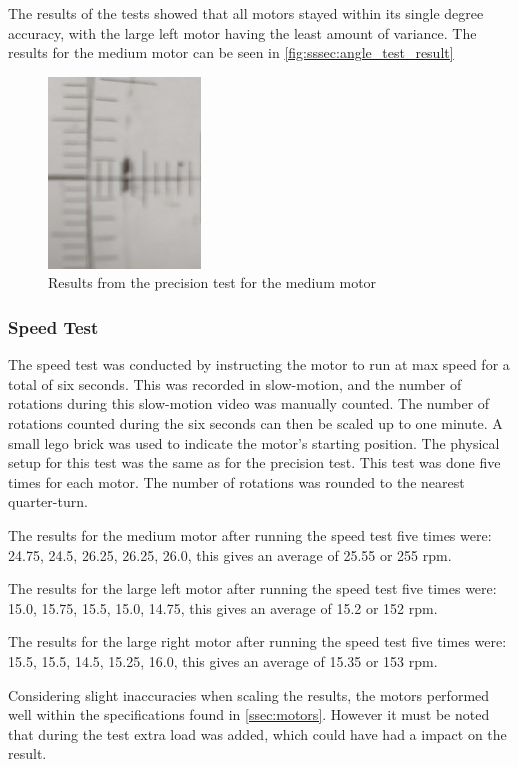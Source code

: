 The results of the tests showed that all motors stayed within its single degree accuracy, with the large left motor having the least amount of variance.
The results for the medium motor can be seen in \autoref{fig:sssec:angle_test_result}

\begin{figure}[H]
    \centering
    \includegraphics[scale = 0.8]{images/techAnalysis/MediumMotorAngleResult.jpg}
    \caption{Results from the precision test for the medium motor}\label{fig:sssec:angle_test_result}
\end{figure}

\subsubsection{Speed Test}
The speed test was conducted by instructing the motor to run at max speed for a total of six seconds.
This was recorded in slow-motion, and the number of rotations during this slow-motion video was manually counted.
The number of rotations counted during the six seconds can then be scaled up to one minute.
A small lego brick was used to indicate the motor's starting position.
The physical setup for this test was the same as for the precision test.
This test was done five times for each motor.
The number of rotations was rounded to the nearest quarter-turn.

The results for the medium motor after running the speed test five times were:
24.75, 24.5, 26.25, 26.25, 26.0, this gives an average of 25.55 or 255 rpm.

The results for the large left motor after running the speed test five times were:
15.0, 15.75, 15.5, 15.0, 14.75, this gives an average of 15.2 or 152 rpm.

The results for the large right motor after running the speed test five times were:
15.5, 15.5, 14.5, 15.25, 16.0, this gives an average of 15.35 or 153 rpm.

Considering slight inaccuracies when scaling the results, the motors performed well within the specifications found in \autoref{ssec:motors}.
However it must be noted that during the test extra load was added, which could have had a impact on the result.
